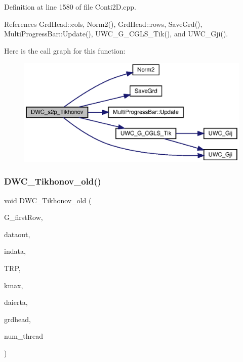 Definition at line 1580 of file Conti2\+D.\+cpp.



References Grd\+Head\+::cols, Norm2(), Grd\+Head\+::rows, Save\+Grd(), Multi\+Progress\+Bar\+::\+Update(), U\+W\+C\+\_\+\+G\+\_\+\+C\+G\+L\+S\+\_\+\+Tik(), and U\+W\+C\+\_\+\+Gji().

Here is the call graph for this function\+:
\nopagebreak
\begin{figure}[H]
\begin{center}
\leavevmode
\includegraphics[width=350pt]{Conti2D_8cpp_abe7855476a24f6e1aa660919f2824d27_abe7855476a24f6e1aa660919f2824d27_cgraph}
\end{center}
\end{figure}
\mbox{\label{Conti2D_8cpp_aca8df189bd3e80e2041b22f7691d87b0_aca8df189bd3e80e2041b22f7691d87b0}} 
\subsubsection{D\+W\+C\+\_\+\+Tikhonov\+\_\+old()}
{\footnotesize\ttfamily void D\+W\+C\+\_\+\+Tikhonov\+\_\+old (\begin{DoxyParamCaption}\item[{double $\ast$}]{G\+\_\+first\+Row,  }\item[{double $\ast$}]{dataout,  }\item[{double $\ast$}]{indata,  }\item[{double}]{T\+RP,  }\item[{int}]{kmax,  }\item[{double}]{daierta,  }\item[{\textbf{ Grd\+Head}}]{grdhead,  }\item[{int}]{num\+\_\+thread }\end{DoxyParamCaption})}



